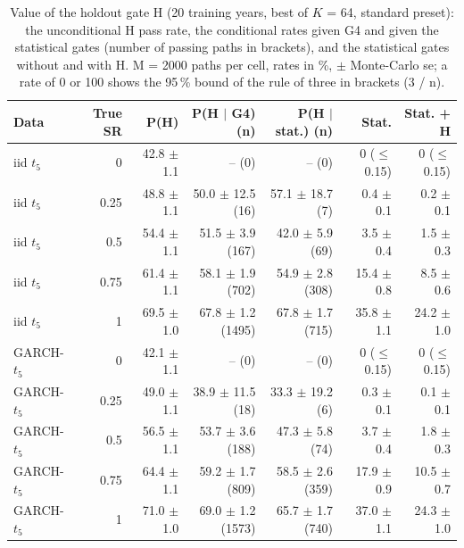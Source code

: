 \begin{table}[H]
\centering
\scriptsize
\caption{Value of the holdout gate H (20 training years, best of $K$ = 64, standard preset): the unconditional H pass rate, the conditional rates given G4 and given the statistical gates (number of passing paths in brackets), and the statistical gates without and with H. M = 2000 paths per cell, rates in \%, $\pm$ Monte-Carlo se; a rate of 0 or 100 shows the 95\,\% bound of the rule of three in brackets (3 / n).}
\label{tab:O4_holdout}
\setlength{\tabcolsep}{3pt}
\begin{tabular}{lrrrrrr}
\toprule
Data & True SR & P(H) & P(H $\mid$ G4) (n) & P(H $\mid$ stat.) (n) & Stat. & Stat. + H \\
\midrule
iid $t_5$ & 0 & 42.8 $\pm$ 1.1 & -- (0) & -- (0) & 0 ($\le$ 0.15) & 0 ($\le$ 0.15) \\
iid $t_5$ & 0.25 & 48.8 $\pm$ 1.1 & 50.0 $\pm$ 12.5 (16) & 57.1 $\pm$ 18.7 (7) & 0.4 $\pm$ 0.1 & 0.2 $\pm$ 0.1 \\
iid $t_5$ & 0.5 & 54.4 $\pm$ 1.1 & 51.5 $\pm$ 3.9 (167) & 42.0 $\pm$ 5.9 (69) & 3.5 $\pm$ 0.4 & 1.5 $\pm$ 0.3 \\
iid $t_5$ & 0.75 & 61.4 $\pm$ 1.1 & 58.1 $\pm$ 1.9 (702) & 54.9 $\pm$ 2.8 (308) & 15.4 $\pm$ 0.8 & 8.5 $\pm$ 0.6 \\
iid $t_5$ & 1 & 69.5 $\pm$ 1.0 & 67.8 $\pm$ 1.2 (1495) & 67.8 $\pm$ 1.7 (715) & 35.8 $\pm$ 1.1 & 24.2 $\pm$ 1.0 \\
\midrule
GARCH-$t_5$ & 0 & 42.1 $\pm$ 1.1 & -- (0) & -- (0) & 0 ($\le$ 0.15) & 0 ($\le$ 0.15) \\
GARCH-$t_5$ & 0.25 & 49.0 $\pm$ 1.1 & 38.9 $\pm$ 11.5 (18) & 33.3 $\pm$ 19.2 (6) & 0.3 $\pm$ 0.1 & 0.1 $\pm$ 0.1 \\
GARCH-$t_5$ & 0.5 & 56.5 $\pm$ 1.1 & 53.7 $\pm$ 3.6 (188) & 47.3 $\pm$ 5.8 (74) & 3.7 $\pm$ 0.4 & 1.8 $\pm$ 0.3 \\
GARCH-$t_5$ & 0.75 & 64.4 $\pm$ 1.1 & 59.2 $\pm$ 1.7 (809) & 58.5 $\pm$ 2.6 (359) & 17.9 $\pm$ 0.9 & 10.5 $\pm$ 0.7 \\
GARCH-$t_5$ & 1 & 71.0 $\pm$ 1.0 & 69.0 $\pm$ 1.2 (1573) & 65.7 $\pm$ 1.7 (740) & 37.0 $\pm$ 1.1 & 24.3 $\pm$ 1.0 \\
\bottomrule
\end{tabular}
\end{table}
